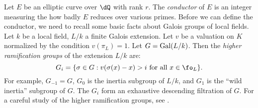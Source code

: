 \documentclass{article}
\begin{document}
%
%







Let $E$ be an elliptic curve over $\dQ$ with rank $r$. The \emph{conductor} of 
$E$ is an integer measuring the how badly $E$ reduces over various primes. 
Before we can define the conductor, we need to recall some basic facts about 
Galois groups of local fields. Let $k$ be a local field, $L/k$ a finite Galois 
extension. Let $v$ be a valuation on $K$ normalized by the condition 
$v(\pi_L)=1$. Let $G=\operatorname{Gal}(L/k)$. Then the \emph{higher ramification groups} of 
the extension $L/k$ are:
\[
  G_i = \{\sigma\in G : v(\sigma (x)-x) > i\text{ for all $x\in \fo_L$}\} \text{.}
\]
For example, $G_{-1}=G$, $G_0$ is the inertia subgroup of $L/k$, and $G_1$ is 
the ``wild inertia'' subgroup of $G$. The $G_i$ form an exhaustive descending 
filtration of $G$. For a careful study of the higher ramification groups, see 
\cite[IV]{se79}. 
\end{document}
